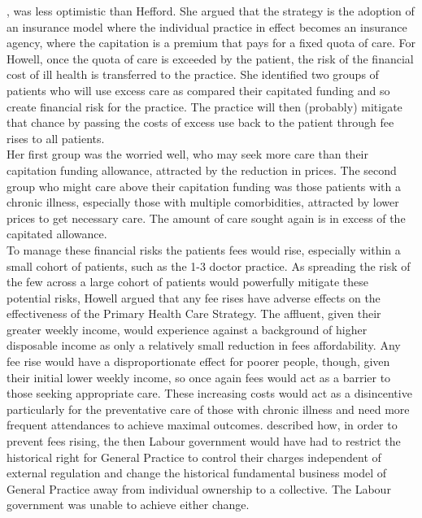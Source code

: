 \documentclass[11pt,a4paper]{article}
\begin{document}
\citet{howell2005restructuring}, was less optimistic than Hefford. She argued that the strategy is the adoption of an insurance model where the individual practice in effect becomes an insurance agency, where the capitation is a premium that pays for a fixed quota of care. For Howell, once the quota of care is exceeded by the patient, the risk of the financial cost of ill health is transferred to the practice. She identified two groups of patients who will use excess care as compared their capitated funding and so create financial risk for the practice. The practice will then (probably) mitigate that chance by passing the costs of excess use back to the patient through fee rises to all patients.\\

Her first group was the worried well, who may seek more care than their capitation funding allowance, attracted by the reduction in prices. The second group who might care above their capitation funding was those patients with a chronic illness, especially those with multiple comorbidities, attracted by lower prices to get necessary care. The amount of care sought again is in excess of the capitated allowance.\\  

To manage these financial risks the patients fees would rise, especially within a small cohort of patients, such as the 1-3 doctor practice. As spreading the risk of the few across a large cohort of patients would powerfully mitigate these potential risks, Howell argued that any fee rises have adverse effects on the effectiveness of the Primary Health Care Strategy. The affluent, given their greater weekly income, would experience against a background of higher disposable income as only a relatively small reduction in fees affordability. Any fee rise would have a disproportionate effect for poorer people, though, given their initial lower weekly income, so once again fees would act as a barrier to those seeking appropriate care. These increasing costs would act as a disincentive particularly for the preventative care of those with chronic illness and need more frequent attendances to achieve maximal outcomes.  \citet{howell2005restructuring} described how, in order to prevent fees rising, the then Labour government would have had to restrict the historical right for General Practice to control their charges independent of external regulation and change the historical fundamental business model of General Practice away from individual ownership to a collective.  The Labour government was unable to achieve either change.  \\
\end{document}

